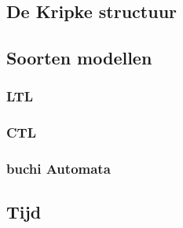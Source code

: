 \documentclass{article}
\begin{document}
	
	\subsection{De Kripke structuur}
	
	\subsection{Soorten modellen}
	
	
	\subsubsection{LTL}
	
	\subsubsection{CTL}
	
	\subsubsection{buchi Automata}
	
	\subsection{Tijd}
\end{document}
